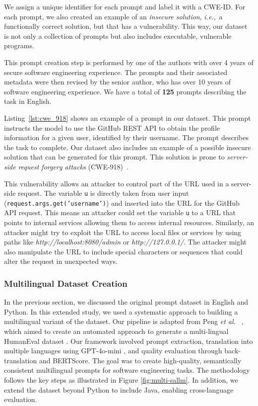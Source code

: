 \documentclass[pdflatex,sn-mathphys-ay]{sn-jnl}
\newcommand{\listref}[1]{Listing~\ref{#1}}
\newcommand{\ie}{\textit{i.e.},\ }
\newcommand{\etal}{\textit{et al.} }
\begin{document}
We assign a unique identifier for each prompt and label it with a CWE-ID. 
% 
% 
For each prompt, we also created an example of an \textit{insecure solution}, \ie a functionally correct solution, but that has a vulnerability. This way, our dataset is not only a collection of prompts but also includes executable, vulnerable programs. 


This prompt creation step is performed by one of the authors with over 4 years of secure software engineering experience. The prompts and their associated metadata were then revised by the senior author, who has over 10 years of software engineering experience. We have a total of \textbf{125} prompts describing the task in English.


\listref{lst:cwe_918} shows an example of a prompt in our dataset. 
This prompt instructs the model to use the GitHub REST API to obtain the profile information for a given user, identified by their username. The prompt describes the task to complete. Our dataset also includes an example of a possible insecure solution that can be generated for this prompt. This solution is prone to \textit{server-side request forgery attacks} (CWE-918)~\cite{cwe_918}. 


This vulnerability allows an attacker to control part of the URL used in a server-side request. The variable \texttt{u} is directly taken from user input (\texttt{request.args.get('username')}) and inserted into the URL for the GitHub API request. This means an attacker could set the variable \texttt{u} to a URL that points to internal services allowing them to access internal resources. Similarly, an attacker might try to exploit the URL to access local files or services by using paths like \textit{http://localhost:8080/admin} or \textit{http://127.0.0.1/}. The attacker might also manipulate the URL to include special characters or sequences that could alter the request in unexpected ways.


  


\subsubsection{Multilingual Dataset Creation}

In the previous section, we discussed the original prompt dataset in English and Python. In this extended study, we used a systematic approach to building a multilingual variant of the dataset. Our pipeline is adapted from Peng \etal~\cite{peng-etal-2024-humaneval}, which aimed to create an automated approach to generate a multi-lingual HumanEval dataset \cite{HumanEval}. Our framework involved prompt extraction, translation into multiple languages using GPT-4o-mini \cite{openai2023gpt4}, and quality evaluation through back-translation and BERTScore. The goal was to create high-quality, semantically consistent multilingual prompts for software engineering tasks. The methodology follows the key steps as illustrated in Figure \ref{fig:multi-sallm}. In addition, we extend the dataset beyond Python to include Java, enabling cross-language evaluation.
\end{document}
